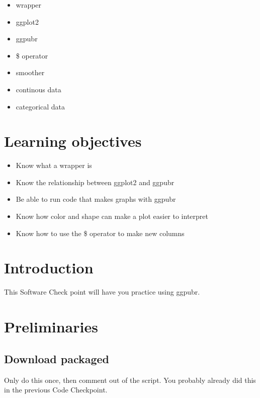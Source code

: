 \documentclass[
]{book}
\providecommand{\tightlist}{%
  \setlength{\itemsep}{0pt}\setlength{\parskip}{0pt}}
\begin{document}
\begin{itemize}
\tightlist
\item
  wrapper
\item
  ggplot2
\item
  ggpubr
\item
  \$ operator
\item
  smoother
\item
  continous data
\item
  categorical data
\end{itemize}

\hypertarget{learning-objectives-2}{%
\section{Learning objectives}\label{learning-objectives-2}}

\begin{itemize}
\tightlist
\item
  Know what a wrapper is
\item
  Know the relationship between ggplot2 and ggpubr
\item
  Be able to run code that makes graphs with ggpubr
\item
  Know how color and shape can make a plot easier to interpret
\item
  Know how to use the \$ operator to make new columns
\end{itemize}

\hypertarget{introduction-4}{%
\section{Introduction}\label{introduction-4}}

This Software Check point will have you practice using ggpubr.

\hypertarget{preliminaries-5}{%
\section{Preliminaries}\label{preliminaries-5}}

\hypertarget{download-packaged-1}{%
\subsection{Download packaged}\label{download-packaged-1}}

Only do this once, then comment out of the script. You probably already did this in the previous Code Checkpoint.
\end{document}
